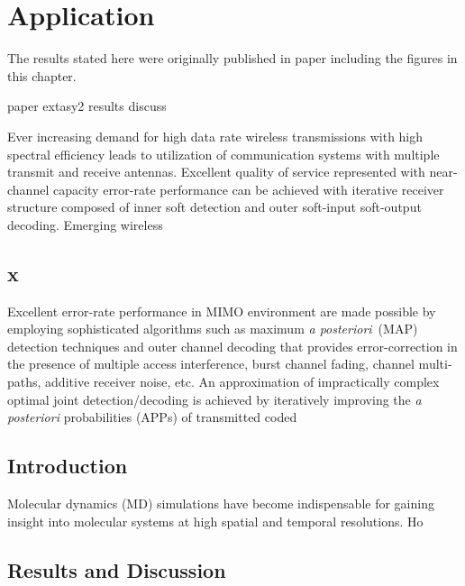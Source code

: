 \chapter{Application}
\label{ch:chapter5}
The results stated here were originally published in paper \cite{Extasy2019} including the figures in this chapter.

paper extasy2 results
discuss

Ever increasing demand for high data rate wireless transmissions with high spectral efficiency leads to utilization of communication systems with multiple transmit and receive antennas. Excellent quality of service represented with near-channel capacity error-rate performance can be achieved with iterative receiver structure composed of inner soft detection and outer soft-input soft-output decoding. Emerging wireless 

\section{x}
\label{sec:x45}
Excellent error-rate performance in MIMO environment are made possible by employing sophisticated algorithms such as maximum \emph{a posteriori}~(MAP) detection techniques and outer channel decoding that provides error-correction in the presence of multiple access interference, burst channel fading, channel multi-paths, additive receiver noise, etc. An approximation of impractically complex optimal joint detection/decoding is achieved by iteratively improving the \emph{a posteriori} probabilities (APPs) of transmitted coded 


\section{\label{sec:intro5}Introduction}

Molecular dynamics (MD) simulations have become indispensable for gaining
insight into molecular systems at high spatial and temporal resolutions.
Ho


\section{\label{sec:res}Results and Discussion}